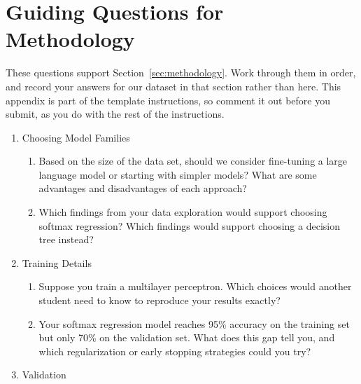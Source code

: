 \documentclass[12pt]{article}
\begin{document}
\section{Guiding Questions for Methodology}\label{app:methodology}

These questions support Section~\ref{sec:methodology}. Work through them in order, and record your answers for our dataset in that section rather than here. This appendix is part of the template instructions, so comment it out before you submit, as you do with the rest of the instructions.

\begin{enumerate}

\item Choosing Model Families

\begin{enumerate}

\item Based on the size of the data set, should we consider fine-tuning a large language model or starting with simpler models? What are some advantages and disadvantages of each approach?

\item Which findings from your data exploration would support choosing softmax regression? Which findings would support choosing a decision tree instead?

\end{enumerate}

\item Training Details

\begin{enumerate}

\item Suppose you train a multilayer perceptron. Which choices would another student need to know to reproduce your results exactly?

\item Your softmax regression model reaches 95\% accuracy on the training set but only 70\% on the validation set. What does this gap tell you, and which regularization or early stopping strategies could you try?

\end{enumerate}

\item Validation

\begin{enumerate}


\end{enumerate}
\end{enumerate}
\end{document}
